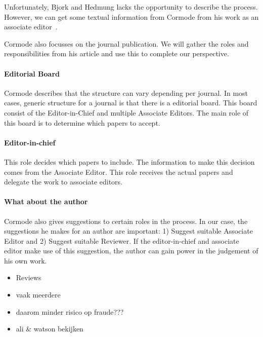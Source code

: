\documentclass{ou-report}
\newcommand{\outline}[1]{{\color{blue} #1}}
\begin{document}
Unfortunately, Bjork and Hedmung lacks the opportunity to describe the process. However, we can get some textual information from Cormode from his work as an associate editor~\cite{C2013}.

Cormode also focusses on the journal publication. We will gather the roles and responsibilities from his article and use this to complete our perspective.
\paragraph{Editorial Board} Cormode describes that the structure can vary depending per journal. In most cases, generic structure for a journal is that there is a editorial board. This board consist of the Editor-in-Chief and multiple Associate Editors. The main role of this board is to determine which papers to accept.
\paragraph{Editor-in-chief} This role decides which papers to include. The information to make this decision comes from the Associate Editor. This role receives the actual papers and delegate the work to associate editors.


\paragraph{What about the author}
Cormode also gives suggestions to certain roles in the process. In our case, the suggestions he makes for an author are important: 1) Suggest suitable Associate Editor and 2) Suggest suitable Reviewer. If the editor-in-chief and associate editor make use of this suggestion, the author can gain power in the judgement of his own work.



\outline{
\begin{itemize}
    \item Reviews
    \item vaak meerdere
    \item daarom minder risico op fraude???
    \item ali \& watson bekijken
\end{itemize}
}
\end{document}
